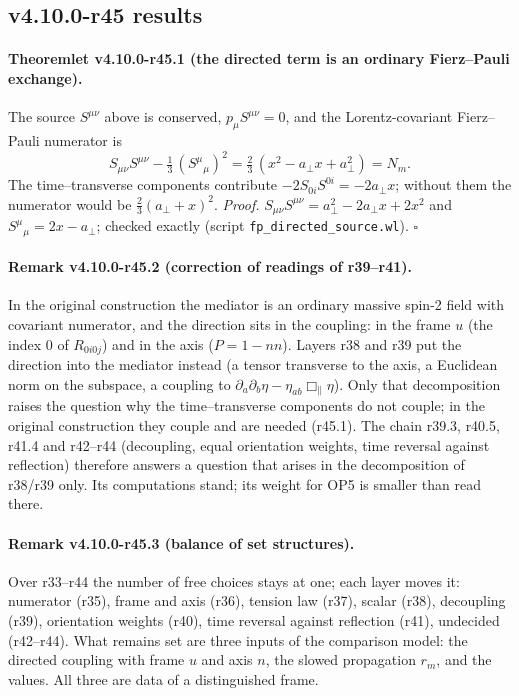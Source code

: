 \subsection*{v4.10.0-r45 results}
\label{subsec:v4100-r45-results}

\paragraph{Theoremlet v4.10.0-r45.1 (the directed term is an ordinary Fierz--Pauli exchange).}
The source \(S^{\mu\nu}\) above is conserved, \(p_\mu S^{\mu\nu}=0\), and the Lorentz-covariant Fierz--Pauli numerator is
\[
 S_{\mu\nu}S^{\mu\nu}-\tfrac13\,(S^\mu{}_\mu)^2=\tfrac23\,(x^2-a_\perp x+a_\perp^2)=N_m .
\]
The time--transverse components contribute \(-2S_{0i}S^{0i}=-2a_\perp x\); without them the numerator would be \(\tfrac23(a_\perp+x)^2\).
\emph{Proof.} \(S_{\mu\nu}S^{\mu\nu}=a_\perp^2-2a_\perp x+2x^2\) and \(S^\mu{}_\mu=2x-a_\perp\); checked exactly (script \texttt{fp\_\allowbreak directed\_\allowbreak source.wl}).  \(\square\)

\paragraph{Remark v4.10.0-r45.2 (correction of readings of r39--r41).}
In the original construction the mediator is an ordinary massive spin-2 field with covariant numerator, and the direction sits in the coupling:
in the frame \(u\) (the index 0 of \(R_{0i0j}\)) and in the axis (\(P=1-nn\)).  Layers r38 and r39 put the direction into the mediator instead (a tensor
transverse to the axis, a Euclidean norm on the subspace, a coupling to \(\partial_a\partial_b\eta-\eta_{ab}\Box_\parallel\eta\)).  Only that decomposition raises the
question why the time--transverse components do not couple; in the original construction they couple and are needed (r45.1).  The chain
r39.3, r40.5, r41.4 and r42--r44 (decoupling, equal orientation weights, time reversal against reflection) therefore answers a question that arises
in the decomposition of r38/r39 only.  Its computations stand; its weight for OP5 is smaller than read there.

\paragraph{Remark v4.10.0-r45.3 (balance of set structures).}
Over r33--r44 the number of free choices stays at one; each layer moves it: numerator (r35), frame and axis (r36), tension law (r37), scalar (r38),
decoupling (r39), orientation weights (r40), time reversal against reflection (r41), undecided (r42--r44).  What remains set are three inputs of the
comparison model: the directed coupling with frame \(u\) and axis \(n\), the slowed propagation \(r_m\), and the values.  All three are data of a
distinguished frame.

